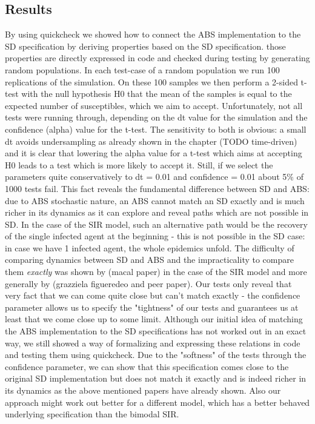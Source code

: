\subsection{Results}
By using quickcheck we showed how to connect the ABS implementation to the SD specification by deriving properties based on the SD specification. those properties are directly expressed in code and checked during testing by generating random populations. In each test-case of a random population we run 100 replications of the simulation. On these 100 samples we then perform a 2-sided t-test with the null hypothesis H0 that the mean of the samples is equal to the expected number of susceptibles, which we aim to accept.
Unfortunately, not all tests were running through, depending on the dt value for the simulation and the confidence (alpha) value for the t-test. The sensitivity to both is obvious: a small dt avoids undersampling as already shown in the chapter (TODO time-driven) and it is clear that lowering the alpha value for a t-test which aims at accepting H0 leads to a test which is more likely to accept it. Still, if we select the parameters quite conservatively to dt = 0.01 and confidence = 0.01 about 5\% of 1000 tests fail.
This fact reveals the fundamental difference between SD and ABS: due to ABS stochastic nature, an ABS cannot match an SD exactly and is much richer in its dynamics as it can explore and reveal paths which are not possible in SD. In the case of the SIR model, such an alternative path would be the recovery of the single infected agent at the beginning - this is not possible in the SD case: in case we have 1 infected agent, the whole epidemics unfold.
The difficulty of comparing dynamics between SD and ABS and the impracticality to compare them \textit{exactly} was shown by \cite{macal_agent-based_2010} (macal paper) in the case of the SIR model and more generally by \cite{figueredo_comparing_2014} (grazziela figueredeo and peer paper). Our tests only reveal that very fact that we can come quite close but can't match exactly - the confidence parameter allows us to specify the "tightness" of our tests and guarantees us at least that we come close up to some limit.
Although our initial idea of matching the ABS implementation to the SD specifications has not worked out in an exact way, we still showed a way of formalizing and expressing these relations in code and testing them using quickcheck. Due to the "softness" of the tests through the confidence parameter, we can show that this specification comes close to the original SD implementation but does not match it exactly and is indeed richer in its dynamics as the above mentioned papers have already shown.
Also our approach might work out better for a different model, which has a better behaved underlying specification than the bimodal SIR.


